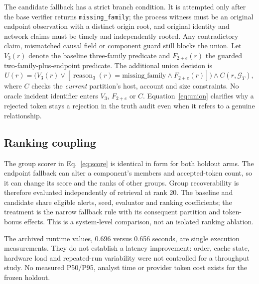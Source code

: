 The candidate fallback has a strict branch condition. It is attempted only after the base verifier returns \texttt{missing\_family}; the process witness must be an original endpoint observation with a distinct origin root, and original identity and network claims must be timely and independently rooted. Any contradictory claim, mismatched causal field or component guard still blocks the union. Let $V_3(r)$ denote the baseline three-family predicate and $F_{2+e}(r)$ the guarded two-family-plus-endpoint predicate. The additional union decision is
\begin{equation}\label{eq:union}
U(r)=\bigl(V_3(r)\lor [\operatorname{reason}_3(r)=\mathrm{missing\_family}\land F_{2+e}(r)]\bigr)
\land C(r,\mathcal G_T),
\end{equation}
where $C$ checks the \emph{current} partition's host, account and size constraints. No oracle incident identifier enters $V_3$, $F_{2+e}$ or $C$. Equation~\ref{eq:union} clarifies why a rejected token stays a rejection in the truth audit even when it refers to a genuine relationship.

\subsection{Ranking coupling}
The group scorer in Eq.~\ref{eq:score} is identical in form for both holdout arms. The endpoint fallback can alter a component's members and accepted-token count, so it can change its score and the ranks of other groups. Group recoverability is therefore evaluated independently of retrieval at rank 20. The baseline and candidate share eligible alerts, seed, evaluator and ranking coefficients; the treatment is the narrow fallback rule with its consequent partition and token-bonus effects. This is a system-level comparison, not an isolated ranking ablation.

The archived runtime values, 0.696 versus 0.656 seconds, are single execution measurements. They do not establish a latency improvement: order, cache state, hardware load and repeated-run variability were not controlled for a throughput study. No measured P50/P95, analyst time or provider token cost exists for the frozen holdout.
